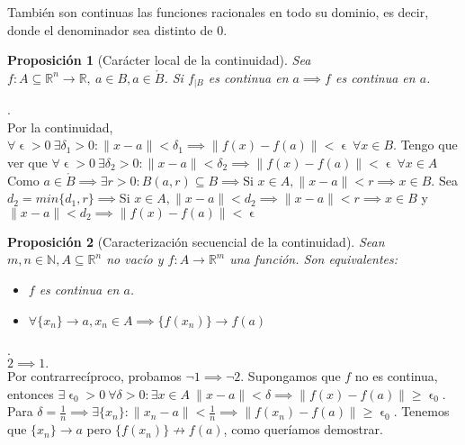 \documentclass[11pt, a4paper]{article}
\makeatletter
\newif\IfInSansMode
\let\oldsf\sffamily
\renewcommand*{\sffamily}{\oldsf\mathversion{sans}\InSansModetrue}
\let\oldnorm\normalfont
\renewcommand*{\normalfont}{\oldnorm\InSansModefalse\mathversion{normal}}
\let\epsilon\upvarepsilon
\newcommand{\R}{\mathbb{R}} \newcommand{\N}{\mathbb{N}}
\renewenvironment{proof}[1][\proofname] {\par\pushQED{\qed}\normalfont\topsep6\p@\@plus6\p@\relax\trivlist\item[\hskip\labelsep\itshape\sffamily#1\@addpunct{.}]\ignorespaces}{\popQED\endtrivlist\@endpefalse}
\theoremstyle{theorem-style}
\newtheorem{nprop}{Proposición}[section]
\theoremstyle{definition-style}
\theoremstyle{remark-style}
\theoremstyle{example-style}
\makeatother
\begin{document}
También son continuas las funciones racionales en todo su dominio, es decir, donde el denominador sea distinto de 0.

\begin{nprop}[Carácter local de la continuidad]
Sea $f: A \subseteq \R^n \to \R, \ a \in B, a \in \mathring{B}$. Si $f_{|B}$ es continua en $a \implies f$ es continua en $a$.
\end{nprop}

\begin{proof}.
\\ Por la continuidad, $ \forall \epsilon > 0 \ \exists \delta_1 > 0: \|x-a\| < \delta_1 \implies \|f(x)-f(a)\| < \epsilon \ \forall x \in B$. Tengo que ver que $ \forall \epsilon > 0 \ \exists \delta_2 > 0: \|x-a\| < \delta_2 \implies \|f(x)-f(a)\| < \epsilon \ \forall x \in A$ \\

Como $a \in \mathring{B} \implies \exists r > 0: B(a,r) \subseteq B \implies $Si $x \in A, \|x-a\| < r \implies x \in B.$ Sea $d_2 = min\{d_1,r\} \implies $Si $x \in A, \|x-a\| < d_2 \implies \|x-a\| < r \implies x \in B $ y $ \|x-a\| < d_2 \implies \|f(x)-f(a)\| < \epsilon$
\end{proof}

\begin{nprop}[Caracterización secuencial de la continuidad]
Sean $m,n \in \N, A \subseteq \R^n$ no vacío y $f:A \to \R^m $ una función. Son equivalentes:

\begin{itemize}
	\item $f$ es continua en $a$.
	\item $\forall \{x_n\} \rightarrow a, x_n \in A \implies \{f(x_n)\} \to f(a)$
\end{itemize}
\end{nprop}

\begin{proof}.
\\ $2 \implies 1.$ \\
Por contrarrecíproco, probamos $\lnot 1 \implies \lnot 2$. Supongamos que $f$ no es continua, entonces $ \exists \epsilon_0 > 0 \ \forall \delta > 0: \exists x \in A \ \|x-a\| < \delta \implies \|f(x)-f(a)\| \ge \epsilon_0$. \\

Para $\delta = \frac{1}{n} \implies \exists \{x_n\}: \|x_n-a\| < \frac{1}{n} \implies \|f(x_n)-f(a)\| \ge \epsilon_0$. Tenemos que $\{x_n\} \rightarrow a$ pero $\{f(x_n)\} \not\rightarrow f(a)$, como queríamos demostrar. 
\end{proof}
\end{document}

